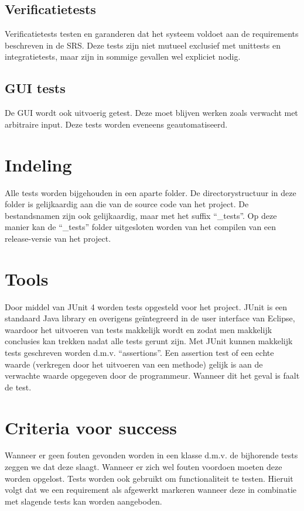 \subsection{Verificatietests}
Verificatietests testen en garanderen dat het systeem voldoet aan de requirements beschreven in de SRS\cite{srs}. 
Deze tests zijn niet mutueel exclusief met unittests en integratietests, maar zijn in sommige gevallen wel expliciet nodig.

\subsection{GUI tests}
De GUI wordt ook uitvoerig getest. Deze moet blijven werken zoals verwacht met arbitraire input. Deze tests worden eveneens geautomatiseerd.

\section{Indeling}
Alle tests worden bijgehouden in een aparte folder. 
De directorystructuur in deze folder is gelijkaardig aan die van de source code van het project. 
De bestandsnamen zijn ook gelijkaardig, maar met het suffix ``\_tests''. 
Op deze manier kan de ``\_tests'' folder uitgesloten worden van het compilen van een release-versie van het project.

\section{Tools}
Door middel van JUnit 4\cite{junit} worden tests opgesteld voor het project. 
JUnit is een standaard Java library en overigens geïntegreerd in de user interface van Eclipse, waardoor het uitvoeren van tests makkelijk wordt en zodat men makkelijk conclusies kan trekken nadat alle tests gerunt zijn. 
Met JUnit kunnen makkelijk tests geschreven worden d.m.v. ``assertions''. 
Een assertion test of een echte waarde (verkregen door het uitvoeren van een methode) gelijk is aan de verwachte waarde opgegeven door de programmeur. Wanneer dit het geval is faalt de test. 	

\section{Criteria voor success}
Wanneer er geen fouten gevonden worden in een klasse d.m.v. de bijhorende tests zeggen we dat deze slaagt. 
Wanneer er zich wel fouten voordoen moeten deze worden opgelost. 
Tests worden ook gebruikt om functionaliteit te testen. 
Hieruit volgt dat we een requirement als afgewerkt markeren wanneer deze in combinatie met slagende tests kan worden aangeboden. 

